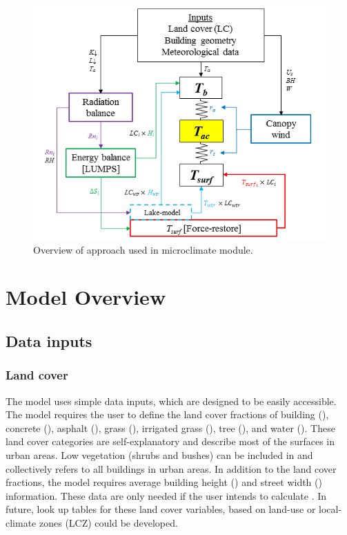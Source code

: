 \documentclass[final,3p,times,authoryear]{elsarticle}
\begin{document}
\begin{figure}[!htbp]
\includegraphics[scale=1.0]{images/Overview.png}
 \caption{Overview of approach used in  microclimate module.} \label{fig:overview}
\end{figure}

\section{Model Overview}\label{sec:ModelOverview}

\subsection{Data inputs}\label{sec:datainputs}
\subsubsection{Land cover}\label{sec:landcover}

The model uses simple data inputs, which are designed to be easily accessible. The model requires the user to define the land cover fractions of building (), concrete (), asphalt (), grass (), irrigated grass (), tree (), and water (). These land cover categories are self-explanatory and describe most of the surfaces in urban areas. Low vegetation (shrubs and bushes) can be included in  and  collectively refers to all buildings in urban areas.  In addition to the land cover fractions, the model requires average building height () and street width () information. These data are only needed if the user intends to calculate ­. In future, look up tables for these land cover variables, based on land-use or local-climate zones (LCZ) \citep{Stewart2012a} could be developed. 
\end{document}
